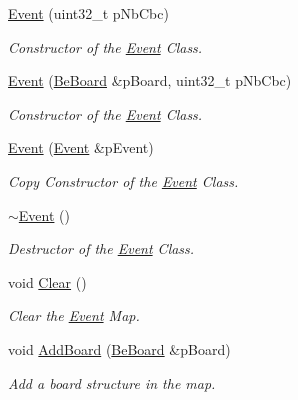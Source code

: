 \begin{DoxyCompactItemize}
\item 
\hyperlink{class_ph2___hw_interface_1_1_event_a76e38e4a345ed8cac86579821efe9b73}{Event} (uint32\-\_\-t p\-Nb\-Cbc)
\begin{DoxyCompactList}\small\item\em Constructor of the \hyperlink{class_ph2___hw_interface_1_1_event}{Event} Class. \end{DoxyCompactList}\item 
\hyperlink{class_ph2___hw_interface_1_1_event_a75a7e673a29d9cca0080c5517895d838}{Event} (\hyperlink{class_ph2___hw_description_1_1_be_board}{Be\-Board} \&p\-Board, uint32\-\_\-t p\-Nb\-Cbc)
\begin{DoxyCompactList}\small\item\em Constructor of the \hyperlink{class_ph2___hw_interface_1_1_event}{Event} Class. \end{DoxyCompactList}\item 
\hyperlink{class_ph2___hw_interface_1_1_event_a3f676bea23859e6417f1ccbade7308df}{Event} (\hyperlink{class_ph2___hw_interface_1_1_event}{Event} \&p\-Event)
\begin{DoxyCompactList}\small\item\em Copy Constructor of the \hyperlink{class_ph2___hw_interface_1_1_event}{Event} Class. \end{DoxyCompactList}\item 
\hyperlink{class_ph2___hw_interface_1_1_event_a2698d395adfcd65d0853676a899127fc}{$\sim$\-Event} ()
\begin{DoxyCompactList}\small\item\em Destructor of the \hyperlink{class_ph2___hw_interface_1_1_event}{Event} Class. \end{DoxyCompactList}\item 
void \hyperlink{class_ph2___hw_interface_1_1_event_ac324585a7a75fb07c51e71317e53ea64}{Clear} ()
\begin{DoxyCompactList}\small\item\em Clear the \hyperlink{class_ph2___hw_interface_1_1_event}{Event} Map. \end{DoxyCompactList}\item 
void \hyperlink{class_ph2___hw_interface_1_1_event_a41a2aae19c78d908c738163e56f1be0b}{Add\-Board} (\hyperlink{class_ph2___hw_description_1_1_be_board}{Be\-Board} \&p\-Board)
\begin{DoxyCompactList}\small\item\em Add a board structure in the map. \end{DoxyCompactList}\item 

\end{DoxyCompactItemize}
